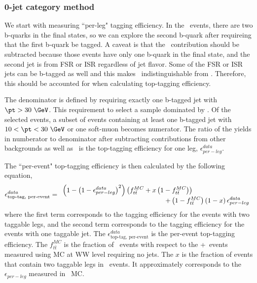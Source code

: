 \subsubsection{0-jet category method}

We start with measuring ``per-leg" tagging efficiency.
In the \ttbar\ events, there are two b-quarks in the final states, 
so we can explore the second b-quark after requireing that the first b-quark be tagged. 
A caveat is that the \tw\ contribution should be subtracted because
those events have only one b-quark in the final state, and the second 
jet is from FSR or ISR regardless of jet flavor. 
Some of the FSR or ISR jets can be b-tagged as well and this 
makes \tw\ indistinguishable from \ttbar. Therefore, this should 
be accounted for when calculating top-tagging efficiency. 

The denominator is defined by requiring exactly one b-tagged jet with $\pt>30~\GeV$. 
This requirement to select a sample dominated by \topbkg.  
Of the selected events, a subset of events containing at least one b-tagged jet
with $10<\pt<30~\GeV$ or one soft-muon becomes numerator. 
The ratio of the yields in numberator to denominator after subtracting contributions 
from other backgrounds as well as \tw\ is the top-tagging efficiency for one leg, 
$\epsilon_{per-leg}^{data}$. 

The ``per-event" top-tagging efficiency is then calculated by the following equation, 
\begin{eqnarray} 
\label{eq:TopTagEff0jet}
\epsilon_{\textrm{top-tag, per-event}}^{data} 
= 
\begin{array}{ccc} \multicolumn{2}{c}{\displaystyle 
\left(1-\left(1-\epsilon_{per-leg}^{data}\right)^2\right) 
\left(f_{t\bar{t}}^{MC} + x\left(1-f_{t\bar{t}}^{MC}\right) \right)
} & \\ & \multicolumn{2}{c}{\hspace{5cm} \displaystyle
+ \left(1-f_{t\bar{t}}^{MC}\right)\left(1-x\right)\epsilon_{per-leg}^{data}
} \end{array}   
\end{eqnarray} 
where the first term corresponds to the tagging efficiency for the events with 
two taggable legs, and the second term corresponds to the tagging efficiency for 
the events with one taggable jet. 
The $\epsilon_{\textrm{top-tag, per-event}}^{data}$ is the per-event top-tagging efficiency. 
The $f_{t\bar{t}}^{MC}$ is the fraction of \ttbar\ events with respect to the 
\ttbar+\tw\ events measured using MC at WW level requiring no jets. 
The $x$ is the fraction of events that contain two taggable legs in \tw\ events. 
It approximately corresponds to the $\epsilon_{per-leg}$ measured in \tw\ MC.  

